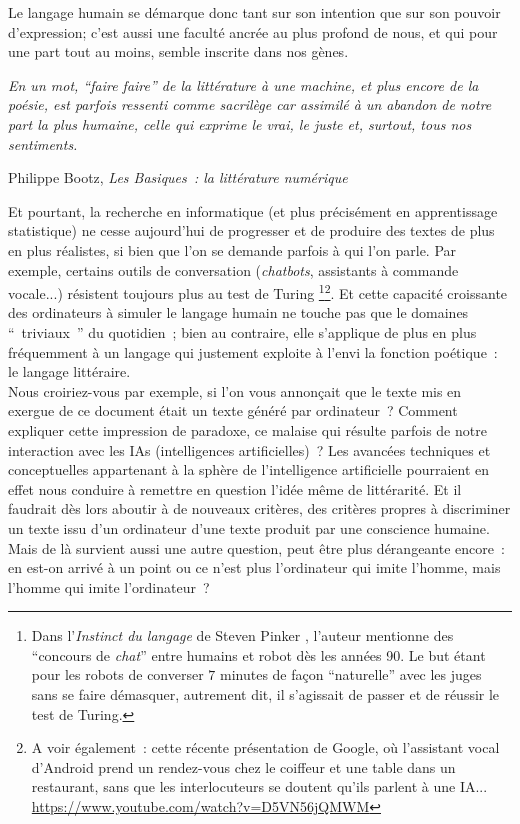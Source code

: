 \documentclass{article}
\newenvironment{citationbox}
{\begin{center}
		\begin{minipage}{.8\textwidth}
		}
		{
		\end{minipage}	
\end{center}
}
\begin{document}
		Le langage humain se démarque donc tant sur son intention que sur son pouvoir d'expression; c'est aussi une faculté ancrée au plus profond de nous, et qui pour une part tout au moins, semble inscrite dans nos gènes\cite{pinker2008}. 
		\begin{citationbox}
			\textit{En un mot, ``faire faire'' de la littérature à une machine, et plus encore de la poésie, est parfois ressenti comme sacrilège car assimilé à un abandon de notre part la plus humaine, celle qui exprime le vrai, le juste et, surtout, tous nos sentiments.}\\
			\begin{flushright}
				Philippe Bootz, \textit{Les Basiques~: la littérature numérique} \cite{bootz2006}
			\end{flushright}
		\end{citationbox}
		Et pourtant, la recherche en informatique (et plus précisément en apprentissage statistique) ne cesse aujourd'hui de progresser et de produire des textes de plus en plus réalistes, si bien que l'on se demande parfois à qui l'on parle. Par exemple, certains outils de conversation (\textit{chatbots}, assistants à commande vocale...) résistent toujours plus au test de Turing \cite{guilet2017}\footnote{Dans l'\textit{Instinct du langage} de Steven Pinker \cite{pinker2008}, l'auteur mentionne des ``concours de \textit{chat}'' entre humains et robot dès les années 90. Le but étant pour les robots de converser $7$ minutes de façon ``naturelle'' avec les juges sans se faire démasquer, autrement dit, il s'agissait de passer et de réussir le test de Turing.}\footnote{A voir également~: cette récente présentation de Google, où l'assistant vocal d'Android prend un rendez-vous chez le coiffeur et une table dans un restaurant, sans que les interlocuteurs se doutent qu'ils parlent à une IA... \href{https://www.youtube.com/watch?v=D5VN56jQMWM}{https://www.youtube.com/watch?v=D5VN56jQMWM}}. Et cette capacité croissante des ordinateurs à simuler le langage humain ne touche pas que le domaines `` triviaux '' du quotidien ; bien au contraire, elle s'applique de plus en plus fréquemment à un langage qui justement exploite à l'envi la fonction poétique~: le langage littéraire.\\
		
		Nous croiriez-vous par exemple, si l'on vous annonçait que le texte mis en exergue de ce document était un texte généré par ordinateur~? Comment expliquer cette impression de paradoxe, ce malaise qui résulte parfois de notre interaction avec les IAs (intelligences artificielles)~? Les avancées techniques et conceptuelles appartenant à la sphère de l'intelligence artificielle pourraient en effet nous conduire à remettre en question l'idée même de littérarité. Et il faudrait dès lors aboutir à de nouveaux critères, des critères propres à discriminer un texte issu d'un ordinateur d'une texte produit par une conscience humaine. Mais de là survient aussi une autre question, peut être plus dérangeante encore~: en est-on arrivé à un point ou ce n'est plus l'ordinateur qui imite l'homme, mais l'homme qui imite l'ordinateur~?\\
		
\end{document}
